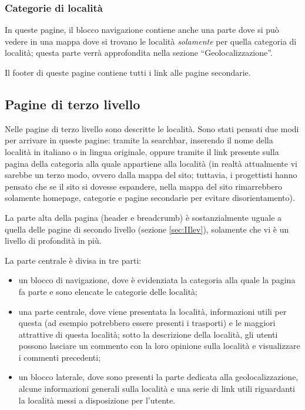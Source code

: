 \subsubsection{Categorie di località}\label{sec:categorieStruct}
In queste pagine, il blocco navigazione contiene anche una parte dove si può vedere in una mappa dove si trovano le località \textit{solamente} per quella categoria di località; questa parte verrà approfondita nella sezione ``Geolocalizzazione''.

Il footer di queste pagine contiene tutti i link alle pagine secondarie.

\subsection{Pagine di terzo livello}
Nelle pagine di terzo livello sono descritte le località. Sono stati pensati due modi per arrivare in queste pagine: tramite la searchbar, inserendo il nome della località in italiano o in lingua originale, oppure tramite il link presente sulla pagina della categoria alla quale appartiene alla località (in realtà attualmente vi sarebbe un terzo modo, ovvero dalla mappa del sito; tuttavia, i progettisti hanno pensato che se il sito si dovesse espandere, nella mappa del sito rimarrebbero solamente homepage, categorie e pagine secondarie per evitare disorientamento).

La parte alta della pagina (header e breadcrumb) è sostanzialmente uguale a quella delle pagine di secondo livello (sezione \ref{sec:IIlev}), solamente che vi è un livello di profondità in più.

La parte centrale è divisa in tre parti:
\begin{itemize}
\item un blocco di navigazione, dove è evidenziata la categoria alla quale la pagina fa parte e sono elencate le categorie delle località;
\item una parte centrale, dove viene presentata la località, informazioni utili per questa (ad esempio potrebbero essere presenti i trasporti) e le maggiori attrattive di questa località; sotto la descrizione della località, gli utenti possono lasciare un commento con la loro opinione sulla località e visualizzare i commenti precedenti;
\item un blocco laterale, dove sono presenti la parte dedicata alla geolocalizzazione, alcune informazioni generali sulla località e una serie di link utili riguardanti la località messi a disposizione per l'utente.
\end{itemize}

